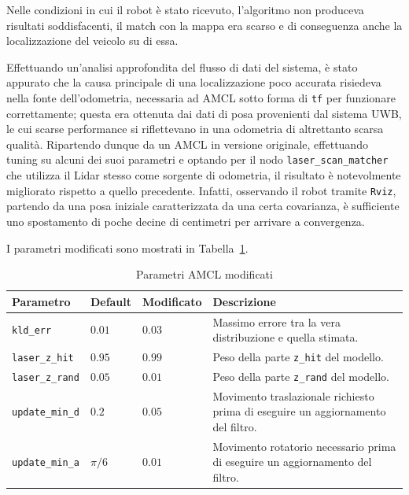 \bigskip

Nelle condizioni in cui il robot è stato ricevuto, l’algoritmo non produceva risultati soddisfacenti, il match con la mappa era scarso e di conseguenza anche la localizzazione del veicolo su di essa. 

Effettuando un'analisi approfondita del flusso di dati del sistema, è stato appurato che la causa principale di una localizzazione poco accurata risiedeva nella fonte dell'odometria, necessaria ad AMCL sotto forma di \verb!tf! per funzionare correttamente; questa era ottenuta dai dati di posa provenienti dal sistema UWB, le cui scarse performance si riflettevano in una odometria di altrettanto scarsa qualità.
Ripartendo dunque da un AMCL in versione originale, effettuando tuning su alcuni dei suoi parametri e optando per il nodo \verb!laser_scan_matcher! che utilizza il Lidar stesso come sorgente di odometria, il risultato è notevolmente migliorato rispetto a quello precedente.
Infatti, osservando il robot tramite \verb!Rviz!, partendo da una posa iniziale caratterizzata da una certa covarianza, è sufficiente uno spostamento di poche decine di centimetri per arrivare a convergenza. 

\bigskip

I parametri modificati sono mostrati in Tabella~\ref{table:parametri_amcl_modificati}.

\bigskip
\begin{table}[h]
\footnotesize
\caption{Parametri AMCL modificati}
\centering
\label{table:parametri_amcl_modificati}
\begin{tabular}{p{}p{}p{}p{}}
\toprule
Parametro           & Default & Modificato & Descrizione \\
\midrule
\texttt{kld\_err}      & $0.01$  & $0.03$     & Massimo errore tra la vera distribuzione e quella stimata.\\

\texttt{laser\_z\_hit}  & $0.95$  & $0.99$     & Peso della parte \texttt{z\_hit} del modello.\\

\texttt{laser\_z\_rand} & $0.05$  & $0.01$     & Peso della parte \texttt{z\_rand} del modello.\\

\texttt{update\_min\_d} & $0.2$   & $0.05$     & Movimento traslazionale richiesto prima di eseguire un aggiornamento del filtro.\\ 

\texttt{update\_min\_a} & $\pi/6$ & $0.01$     &  Movimento rotatorio necessario prima di eseguire un aggiornamento del filtro.\\ 

\bottomrule
\end{tabular}
\end{table}

